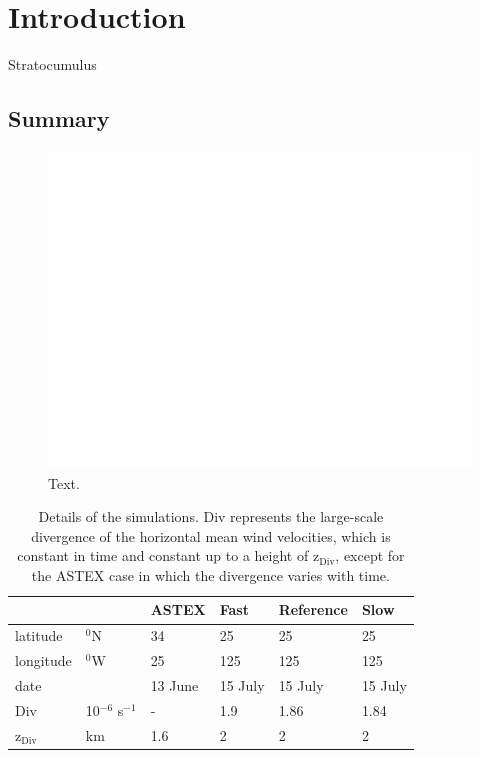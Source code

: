 \documentclass[12pt]{article}
\begin{document}
\section{Introduction}
Stratocumulus 
   

\subsection{Summary }

%
\begin{figure}[ht]
\includegraphics[width=40pc]{wolk.pdf}
\caption{Text.}
\label{fig:test}
\end{figure}
%
%
 

\begin{table}
\begin{tabular}{ l l l l l l}
\hline
     &          & ASTEX & Fast & Reference & Slow \\           
\hline 
latitude  & $^0$N  &     34 &   25  &   25 & 25  \\
longitude & $^0$W  &     25 &   125  &   125 & 125  \\
date      &        & 13 June  & 15 July & 15 July & 15 July \\ 
Div       & 10$^{-6}$ s$^{-1}$   &  - & 1.9 & 1.86 & 1.84 \\  
z$_{\mathrm{Div}}$ & km & 1.6 & 2  & 2 & 2 \\
\hline       
\end{tabular}   
\caption{Details of the simulations. Div represents the large-scale divergence of the horizontal mean wind velocities, which is constant in time and constant up to a height of z$_{\mathrm{Div}}$, except for the ASTEX case in which the divergence varies with time.}
\label{tab:set_up}
\end{table}
 
\end{document}
